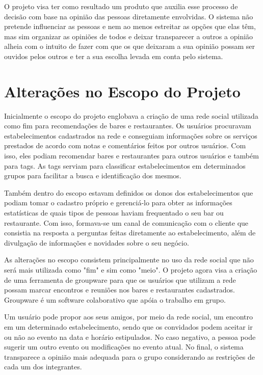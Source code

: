     O projeto visa ter como resultado um produto que auxilia esse processo de decisão com base na opinião das pessoas diretamente envolvidas. O sistema não pretende influenciar as pessoas e nem ao menos estreitar as opções que elas têm, mas sim organizar as opiniões de todos e deixar transparecer a outros a opinião alheia com o intuito de fazer com que os que deixaram a sua opinião possam ser ouvidos pelos outros e ter a sua escolha levada em conta pelo sistema.

\section{Alterações no Escopo do Projeto}

    Inicialmente o escopo do projeto englobava a criação de uma rede social utilizada como fim para recomendações de bares e restaurantes. Os usuários procuravam estabelecimentos cadastrados na rede e conseguiam informações sobre os serviços prestados de acordo com notas e comentários feitos por outros usuários. Com isso, eles podiam recomendar bares e restaurantes para outros usuários e também para tags. As tags serviam para classificar estabelecimentos em determinados grupos para facilitar a busca e identificação dos mesmos.
 
    Também dentro do escopo estavam definidos os donos dos estabelecimentos que podiam tomar o cadastro próprio e gerenciá-lo para obter as informações estatísticas de quais tipos de pessoas haviam frequentado o seu bar ou restaurante. Com isso, formava-se um canal de comunicação com o cliente que consistia na resposta a perguntas feitas diretamente ao estabelecimento, além de divulgação de informações e novidades sobre o seu negócio.
 
    As alterações no escopo consistem principalmente no uso da rede social que não será mais utilizada como "fim" e sim como "meio". O projeto agora visa a criação de uma ferramenta de groupware para que os usuários que utilizam a rede possam marcar encontros e reuniões nos bares e restaurantes cadastrados. Groupware é um software colaborativo que apóia o trabalho em grupo.

    Um usuário pode propor aos seus amigos, por meio da rede social, um encontro em um determinado estabelecimento, sendo que os convidados podem aceitar ir ou não ao evento na data e horário estipulados. No caso negativo, a pessoa pode sugerir um outro evento ou modificações no evento atual. No final, o sistema transparece a opinião mais adequada para o grupo considerando as restrições de cada um dos integrantes.
 
